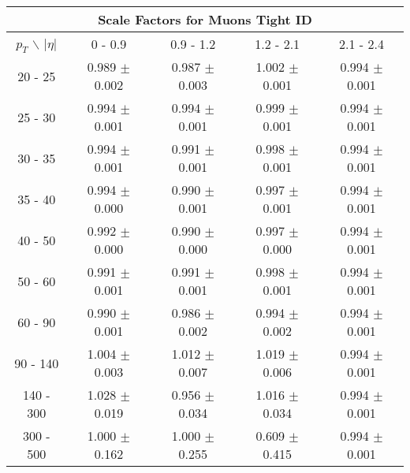 \begin{tabular}{ccccc}
\multicolumn{5}{c}{Scale Factors for Muons Tight ID} \\ \hline
$p_T$  $\backslash$ $|\eta|$ & 0 - 0.9 & 0.9 - 1.2 & 1.2 - 2.1 & 2.1 - 2.4 \\ \hline
20 - 25  &  0.989 $\pm$ 0.002  &  0.987 $\pm$ 0.003  &  1.002 $\pm$ 0.001  &  0.994 $\pm$ 0.001\\ 
25 - 30  &  0.994 $\pm$ 0.001  &  0.994 $\pm$ 0.001  &  0.999 $\pm$ 0.001  &  0.994 $\pm$ 0.001\\ 
30 - 35  &  0.994 $\pm$ 0.001  &  0.991 $\pm$ 0.001  &  0.998 $\pm$ 0.001  &  0.994 $\pm$ 0.001\\ 
35 - 40  &  0.994 $\pm$ 0.000  &  0.990 $\pm$ 0.001  &  0.997 $\pm$ 0.001  &  0.994 $\pm$ 0.001\\ 
40 - 50  &  0.992 $\pm$ 0.000  &  0.990 $\pm$ 0.000  &  0.997 $\pm$ 0.000  &  0.994 $\pm$ 0.001\\ 
50 - 60  &  0.991 $\pm$ 0.001  &  0.991 $\pm$ 0.001  &  0.998 $\pm$ 0.001  &  0.994 $\pm$ 0.001\\ 
60 - 90  &  0.990 $\pm$ 0.001  &  0.986 $\pm$ 0.002  &  0.994 $\pm$ 0.002  &  0.994 $\pm$ 0.001\\ 
90 - 140  &  1.004 $\pm$ 0.003  &  1.012 $\pm$ 0.007  &  1.019 $\pm$ 0.006  &  0.994 $\pm$ 0.001\\ 
140 - 300  &  1.028 $\pm$ 0.019  &  0.956 $\pm$ 0.034  &  1.016 $\pm$ 0.034  &  0.994 $\pm$ 0.001\\ 
300 - 500  &  1.000 $\pm$ 0.162  &  1.000 $\pm$ 0.255  &  0.609 $\pm$ 0.415  &  0.994 $\pm$ 0.001\\ 
\hline \end{tabular}
